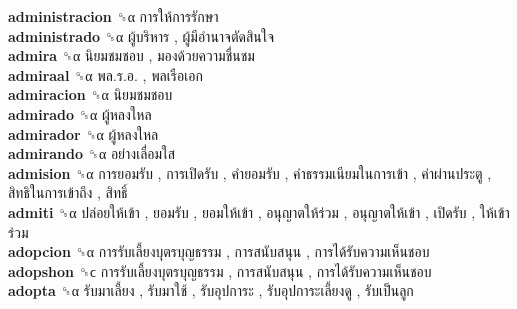 \textbf{administracion} ␝α   การให้การรักษา   \\
\textbf{administrado} ␝α   ผู้บริหาร ,  ผู้มีอำนาจตัดสินใจ   \\
\textbf{admira} ␝α   นิยมชมชอบ ,  มองด้วยความชื่นชม   \\
\textbf{admiraal} ␝α   พล.ร.อ. ,  พลเรือเอก   \\
\textbf{admiracion} ␝α   นิยมชมชอบ   \\
\textbf{admirado} ␝α   ผู้หลงใหล   \\
\textbf{admirador} ␝α   ผู้หลงใหล   \\
\textbf{admirando} ␝α   อย่างเลื่อมใส   \\
\textbf{admision} ␝α   การยอมรับ ,  การเปิดรับ ,  คำยอมรับ ,  ค่าธรรมเนียมในการเข้า ,  ค่าผ่านประตู ,  สิทธิในการเข้าถึง ,  สิทธิ์   \\
\textbf{admiti} ␝α   ปล่อยให้เข้า ,  ยอมรับ ,  ยอมให้เข้า ,  อนุญาตให้ร่วม ,  อนุญาตให้เข้า ,  เปิดรับ ,  ให้เข้าร่วม   \\
\textbf{adopcion} ␝α   การรับเลี้ยงบุตรบุญธรรม ,  การสนับสนุน ,  การได้รับความเห็นชอบ   \\
\textbf{adopshon} ␝ϲ   การรับเลี้ยงบุตรบุญธรรม ,  การสนับสนุน ,  การได้รับความเห็นชอบ   \\
\textbf{adopta} ␝α   รับมาเลี้ยง ,  รับมาใช้ ,  รับอุปการะ ,  รับอุปการะเลี้ยงดู ,  รับเป็นลูก   \\
